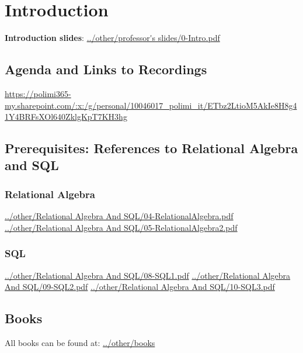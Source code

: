 \section{Introduction}
\textbf{Introduction slides}:\newline
\url{../other/professor's slides/0-Intro.pdf}
\subsection{Agenda and Links to Recordings}
\url{https://polimi365-my.sharepoint.com/:x:/g/personal/10046017_polimi_it/ETbz2LtioM5AkIe8H8g41Y4BRFsXOl640ZklgKpT7KH3hg}
\subsection{Prerequisites: References to Relational Algebra and SQL}
\subsubsection{Relational Algebra}
\url{../other/Relational Algebra And SQL/04-RelationalAlgebra.pdf}\newline
\newline
\url{../other/Relational Algebra And SQL/05-RelationalAlgebra2.pdf}
\subsubsection{SQL}
\url{../other/Relational Algebra And SQL/08-SQL1.pdf}\newline
\newline
\url{../other/Relational Algebra And SQL/09-SQL2.pdf}\newline
\newline
\url{../other/Relational Algebra And SQL/10-SQL3.pdf}
\subsection{Books}
All books can be found at:\newline
\url{../other/books}\newline
\newline